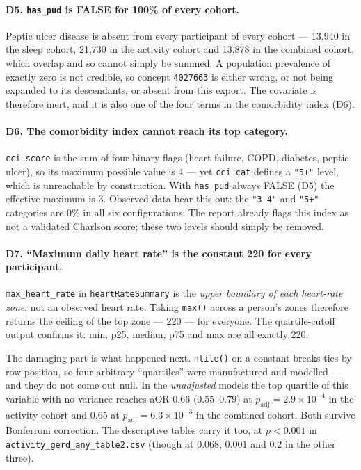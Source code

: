 \documentclass[11pt]{article}
\newcommand{\code}[1]{\texttt{\small #1}}
\begin{document}
\paragraph{D5. \code{has_pud} is FALSE for 100\% of every cohort.}
Peptic ulcer disease is absent from every participant of every cohort --- 13{,}940 in the sleep
cohort, 21{,}730 in the activity cohort and 13{,}878 in the combined cohort, which overlap and so
cannot simply be summed. A population prevalence of exactly zero is not credible, so concept
\code{4027663} is either wrong, or not being expanded to its descendants, or absent from this
export. The covariate is therefore
inert, and it is also one of the four terms in the comorbidity index (D6).

\paragraph{D6. The comorbidity index cannot reach its top category.}
\code{cci_score} is the sum of four binary flags (heart failure, COPD, diabetes, peptic ulcer), so
its maximum possible value is 4 --- yet \code{cci_cat} defines a \code{"5+"} level, which is
unreachable by construction. With \code{has_pud} always FALSE (D5) the effective maximum is 3.
Observed data bear this out: the \code{"3-4"} and \code{"5+"} categories are $0\%$ in all six
configurations. The report already flags this index as not a validated Charlson score; these two
levels should simply be removed.

\paragraph{D7. ``Maximum daily heart rate'' is the constant 220 for every participant.}
\code{max_heart_rate} in \code{heartRateSummary} is the \emph{upper boundary of each heart-rate
zone}, not an observed heart rate. Taking \code{max()} across a person's zones therefore returns
the ceiling of the top zone --- 220 --- for everyone. The quartile-cutoff output confirms it: min,
p25, median, p75 and max are all exactly 220.

The damaging part is what happened next. \code{ntile()} on a constant breaks ties by row position,
so four arbitrary ``quartiles'' were manufactured and modelled --- and they do not come out null.
In the \emph{unadjusted} models the top quartile of this variable-with-no-variance reaches
aOR $0.66$ ($0.55$--$0.79$) at $p_{\text{adj}} = 2.9\times10^{-4}$ in the activity cohort and
$0.65$ at $p_{\text{adj}} = 6.3\times10^{-3}$ in the combined cohort. Both survive Bonferroni
correction. The descriptive tables carry it too, at $p<0.001$ in
\code{activity_gerd_any_table2.csv} (though at $0.068$, $0.001$ and $0.2$ in the other three).
\end{document}
